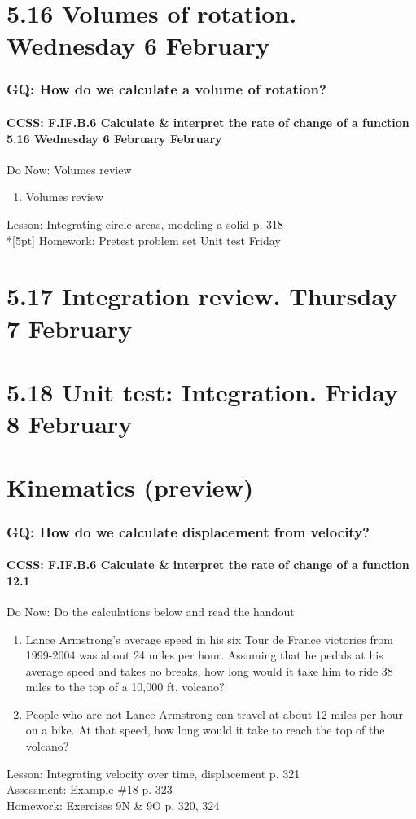 \documentclass{beamer}
\begin{document}
  \section{5.16 Volumes of rotation. Wednesday 6 February}
  \frame
  {
    \frametitle{GQ: How do we calculate a volume of rotation?}
    \framesubtitle{CCSS: F.IF.B.6 Calculate \& interpret the rate of change of a function  \alert{5.16 Wednesday 6 February February}}

    \begin{block}{Do Now: Volumes review}
    \begin{enumerate}
        \item Volumes review
    \end{enumerate}
    \end{block}
    Lesson: Integrating circle areas, modeling a solid p. 318\\*[5pt]
    Homework: Pretest problem set \alert{Unit test Friday}
  }

  \section{5.17 Integration review. Thursday 7 February}

  \section{5.18 Unit test: Integration. Friday 8 February}


  \section{Kinematics (preview)}
  \frame
  {
    \frametitle{GQ: How do we calculate displacement from velocity?}
    \framesubtitle{CCSS: F.IF.B.6 Calculate \& interpret the rate of change of a function \qquad \alert{12.1}}

    \begin{block}{Do Now: Do the calculations below and read the handout}
    \begin{enumerate}
        \item Lance Armstrong’s average speed in his six Tour de France victories from 1999-2004 was about 24 miles per hour. Assuming that he pedals at his average speed and takes no breaks, how long would it take him to ride 38 miles to the top of a 10,000 ft. volcano?
        \item People who are not Lance Armstrong can travel at about 12 miles per hour on a bike. At that speed, how long would it take to reach the top of the volcano?
    \end{enumerate}
    \end{block}
    Lesson: Integrating velocity over time, displacement p. 321\\%
    Assessment: Example \#18 p. 323 \\%
    Homework: Exercises 9N \& 9O p. 320, 324
  }
\end{document}
